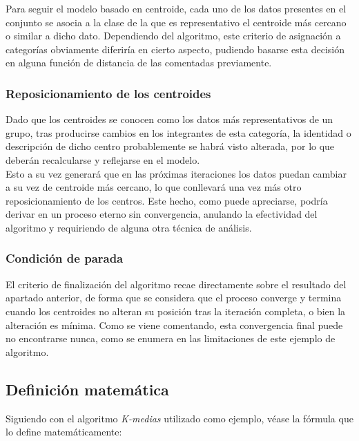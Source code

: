 \documentclass[]{report}
\begin{document}
					Para seguir el modelo basado en centroide, cada uno de los datos presentes en el conjunto se asocia a la clase de la que es representativo el centroide más cercano o similar a dicho dato. Dependiendo del algoritmo, este criterio de asignación a categorías obviamente diferiría en cierto aspecto, pudiendo basarse esta decisión en alguna función de distancia de las comentadas previamente.
				
				\subsubsection{Reposicionamiento de los centroides}
				
					Dado que los centroides se conocen como los datos más representativos de un grupo, tras producirse cambios en los integrantes de esta categoría, la identidad o descripción de dicho centro probablemente se habrá visto alterada, por lo que deberán recalcularse y reflejarse en el modelo.\\
					
					Esto a su vez generará que en las próximas iteraciones los datos puedan cambiar a su vez de centroide más cercano, lo que conllevará una vez más otro reposicionamiento de los centros. Este hecho, como puede apreciarse, podría derivar en un proceso eterno sin convergencia, anulando la efectividad del algoritmo y requiriendo de alguna otra técnica de análisis.
				
				\subsubsection{Condición de parada}
				
					El criterio de finalización del algoritmo recae directamente sobre el resultado del apartado anterior, de forma que se considera que el proceso converge y termina cuando los centroides no alteran su posición tras la iteración completa, o bien la alteración es mínima. Como se viene comentando, esta convergencia final puede no encontrarse nunca, como se enumera en las limitaciones de este ejemplo de algoritmo.
					
			\subsection{Definición matemática}
			
				Siguiendo con el algoritmo \textit{K-medias} utilizado como ejemplo, véase la fórmula que lo define matemáticamente:
			
\end{document}
